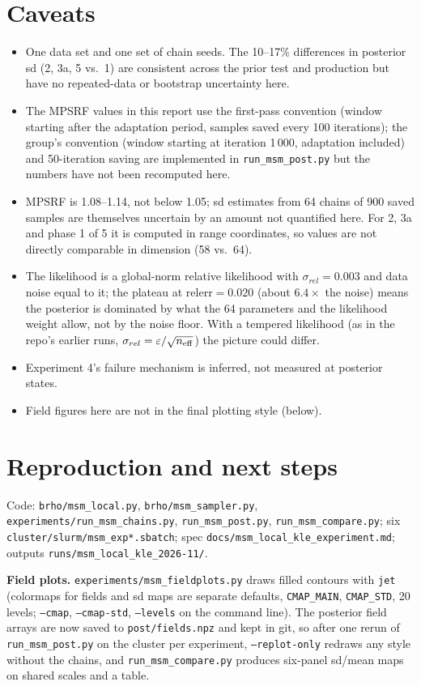 \documentclass[11pt]{article}
\newcommand{\rel}{\mathrm{relerr}}
\begin{document}
\section{Caveats}\label{sec:caveats}
\begin{itemize}
\item One data set and one set of chain seeds. The 10--17\% differences in posterior sd (2, 3a, 5 vs.\ 1) are consistent across the prior test and production but have no repeated-data or bootstrap uncertainty here.
\item The MPSRF values in this report use the first-pass convention (window starting after the adaptation period, samples saved every 100 iterations); the group's convention (window starting at iteration 1\,000, adaptation included) and 50-iteration saving are implemented in \texttt{run\_msm\_post.py} but the numbers have not been recomputed here. \item MPSRF is 1.08--1.14, not below 1.05; sd estimates from 64 chains of 900 saved samples are themselves uncertain by an amount not quantified here. For 2, 3a and phase 1 of 5 it is computed in range coordinates, so values are not directly comparable in dimension (58 vs.\ 64).
\item The likelihood is a global-norm relative likelihood with $\sigma_{rel}=0.003$ and data noise equal to it; the plateau at $\rel=0.020$ (about $6.4\times$ the noise) means the posterior is dominated by what the 64 parameters and the likelihood weight allow, not by the noise floor. With a tempered likelihood (as in the repo's earlier runs, $\sigma_{rel}=\varepsilon/\sqrt{n_{\rm eff}}$) the picture could differ.
\item Experiment 4's failure mechanism is inferred, not measured at posterior states.
\item Field figures here are not in the final plotting style (below).
\end{itemize}

\section{Reproduction and next steps}\label{sec:repro}
Code: \texttt{brho/msm\_local.py}, \texttt{brho/msm\_sampler.py}, \texttt{experiments/run\_msm\_chains.py}, \texttt{run\_msm\_post.py}, \texttt{run\_msm\_compare.py}; six \texttt{cluster/slurm/msm\_exp*.sbatch}; spec \texttt{docs/msm\_local\_kle\_experiment.md}; outputs \texttt{runs/msm\_local\_kle\_2026-11/}.

\textbf{Field plots.} \texttt{experiments/msm\_fieldplots.py} draws filled contours with \texttt{jet} (colormaps for fields and sd maps are separate defaults, \texttt{CMAP\_MAIN}, \texttt{CMAP\_STD}, 20 levels; \texttt{--cmap}, \texttt{--cmap-std}, \texttt{--levels} on the command line). The posterior field arrays are now saved to \texttt{post/fields.npz} and kept in git, so after one rerun of \texttt{run\_msm\_post.py} on the cluster per experiment, \texttt{--replot-only} redraws any style without the chains, and \texttt{run\_msm\_compare.py} produces six-panel sd/mean maps on shared scales and a table.
\end{document}
